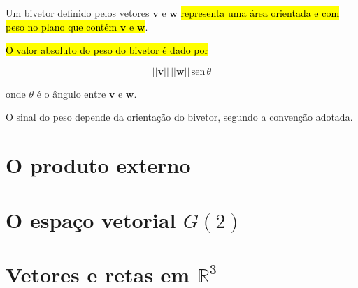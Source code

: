 \documentclass[
  letterpaper,
  DIV=11,
  numbers=noendperiod]{scrreprt}
\begin{document}
\begin{itemize}
  \begin{tcolorbox}[standard jigsaw,colbacktitle=quarto-callout-note-color!10!white, colback=white, opacitybacktitle=0.6, colframe=quarto-callout-note-color-frame, bottomtitle=1mm, toptitle=1mm, coltitle=black, titlerule=0mm, leftrule=.75mm, title=\textcolor{quarto-callout-note-color}{\faInfo}\hspace{0.5em}{Resumindo: bivetores \(=\) áreas orientadas e com peso}, left=2mm, rightrule=.15mm, arc=.35mm, toprule=.15mm, bottomrule=.15mm, opacityback=0]
  Um bivetor definido pelos vetores $\mathbf{v}$ e $\mathbf{w}$
  {\hl{representa uma área orientada e com peso no plano que contém
  $\mathbf{v}$ e $\mathbf{w}$}}.

  {\hl{O valor absoluto do peso do bivetor é dado por}}

  \[
  ||\mathbf{v}||\, ||\mathbf{w}|| \,\text{sen}\,\theta
  \]

  onde $\theta$ é o ângulo entre $\mathbf{v}$ e $\mathbf{w}$.

  O sinal do peso depende da orientação do bivetor, segundo a convenção
  adotada.
  \end{tcolorbox}
\end{itemize}

\hypertarget{o-produto-externo}{%
\section{O produto externo}\label{o-produto-externo}}

\hypertarget{o-espauxe7o-vetorial-g2}{%
\section{\texorpdfstring{O espaço vetorial
$G(2)$}{O espaço vetorial }}\label{o-espauxe7o-vetorial-g2}}

\hypertarget{vetores-e-retas-em-mathbbr3}{%
\section{\texorpdfstring{Vetores e retas em
$\mathbb{R}^3$}{Vetores e retas em }}\label{vetores-e-retas-em-mathbbr3}}
\end{document}
